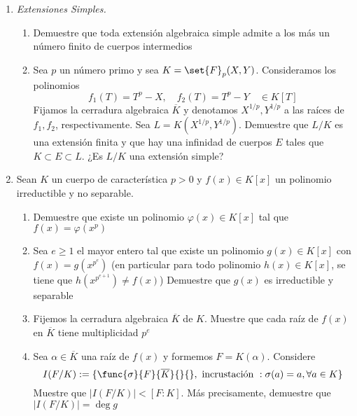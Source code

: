 \documentclass[11pt]{article}
\begin{document}
\begin{enumerate}[label=(\arabic*)]
\begin{proof}
\begin{enumerate}[label=(\alph*)]
                \item Nos tomamos la siguiente extensión $\set{Q}(\sqrt{2}+\sqrt{5})\subseteq\set{Q}(\sqrt{5},\sqrt{2})$, luego si $[\set{Q}(\sqrt{2}+\sqrt{5}):\set{Q}]=4$, entonces $\set{Q}(\sqrt{2}+\sqrt{5})=\set{Q}(\sqrt{5},\sqrt{2})$. Para esto 
                
                \item 
            \end{enumerate}
        \end{proof}

        \item \textit{Extensiones Simples.}
        \begin{enumerate}[label=(\alph*)]
            \item Demuestre que toda extensión algebraica simple admite a los más un número finito de cuerpos intermedios

            \item Sea $p$ un número primo y sea $K=\set{F}_p(X,Y)$. Consideramos los polinomios
            \[f_1(T)=T^p-X,\quad f_2(T)=T^p-Y\quad\in K[T]\]
            Fijamos la cerradura algebraica $\overline{K}$ y denotamos $X^{1/p},Y^{1/p}$ a las raíces de $f_1,f_2$, respectivamente. Sea $L=K(X^{1/p},Y^{1/p})$. Demuestre que $L/K$ es una extensión finita y que hay una infinidad de cuerpos $E$ tales que $K\subset E\subset L$. ¿Es $L/K$ una extensión simple?
        \end{enumerate}

        \item Sean $K$ un cuerpo de característica $p>0$ y $f(x)\in K[x]$ un polinomio irreductible y no separable.
        \begin{enumerate}[label=(\alph*)]
            \item Demuestre que existe un polinomio $\varphi(x)\in K[x]$ tal que $f(x)=\varphi(x^p)$

            \item Sea $e\geq 1$ el mayor entero tal que existe un polinomio $g(x)\in K[x]$ con $f(x)=g(x^{p^e})$ (en particular para todo polinomio $h(x)\in K[x]$, se tiene que $h(x^{p^{e+1}})\neq f(x)$) Demuestre que $g(x)$ es irreductible y separable

            \item Fijemos la cerradura algebraica $\overline{K}$ de $K$. Muestre que cada raíz de $f(x)$ en $\overline{K}$ tiene multiplicidad $p^e$

            \item Sea $\alpha\in\overline{K}$ una raíz de $f(x)$ y formemos $F=K(\alpha)$. Considere
            \[I(F/K):=\{\func{\sigma}{F}{\overline{K}}{}{},\text{ incrustación }:\sigma(a)=a,\forall a\in K\}\]
            Muestre que $|I(F/K)|<[F:K]$. Más precisamente, demuestre que $|I(F/K)|=\deg g$
        \end{enumerate}
    \end{enumerate}
\end{document}
